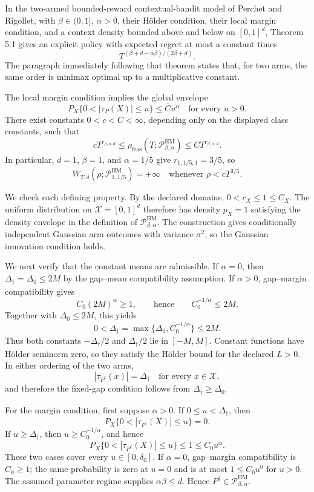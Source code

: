 In the two-armed bounded-reward contextual-bandit model of Perchet and Rigollet, with \(\beta\in(0,1]\), \(\alpha>0\), their H\"older condition, their local margin condition, and a context density bounded above and below on \([0,1]^d\), Theorem 5.1 gives an explicit policy with expected regret at most a constant times
\[
T^{(\beta+d-\alpha\beta)/(2\beta+d)}.
\]
The paragraph immediately following that theorem states that, for two arms, the same order is minimax optimal up to a multiplicative constant.

The local margin condition implies the global envelope
\[
P_X\{0<|\tau_P(X)|\leq u\}\leq\overline C u^\alpha
\quad\text{for every }u>0.
\]
There exist constants \(0<c<C<\infty\), depending only on the displayed class constants, such that
\[
cT^{r_{\beta,\alpha,d}}
\leq\rho_{\mathrm{feas}}(T;\mathcal P_{\beta,\alpha}^{\mathrm{HM}})
\leq CT^{r_{\beta,\alpha,d}}.
\]
In particular, \(d=1\), \(\beta=1\), and \(\alpha=1/5\) give \(r_{1,1/5,1}=3/5\), so
\[
W_{T,\delta}(\rho;\mathcal P_{1,1/5}^{\mathrm{HM}})=+\infty
\quad\text{whenever }\rho<cT^{3/5}.
\]

We check each defining property.  By the declared domains, \(0<c_X\leq1\leq C_X\).  The uniform distribution on \(\mathcal X=[0,1]^d\) therefore has density \(p_X=1\) satisfying the density envelope in the definition of \(\mathcal P_{\beta,\alpha}^{\mathrm{HM}}\).  The construction gives conditionally independent Gaussian arm outcomes with variance \(\sigma^2\), so the Gaussian innovation condition holds.

We next verify that the constant means are admissible.  If \(\alpha=0\), then \(\Delta_\dagger=\Delta_0\leq2M\) by the gap--mean compatibility assumption.  If \(\alpha>0\), gap--margin compatibility gives
\[
C_0(2M)^\alpha\geq1,
\qquad\text{hence}\qquad
C_0^{-1/\alpha}\leq2M.
\]
Together with \(\Delta_0\leq2M\), this yields
\[
0<\Delta_\dagger=\max\{\Delta_0,C_0^{-1/\alpha}\}\leq2M.
\]
Thus both constants \(-\Delta_\dagger/2\) and \(\Delta_\dagger/2\) lie in \([-M,M]\).  Constant functions have H\"older seminorm zero, so they satisfy the H\"older bound for the declared \(L>0\).  In either ordering of the two arms,
\[
|\tau_{P^\dagger}(x)|=\Delta_\dagger
\quad\text{for every }x\in\mathcal X,
\]
and therefore the fixed-gap condition follows from \(\Delta_\dagger\geq\Delta_0\).

For the margin condition, first suppose \(\alpha>0\).  If \(0\leq u<\Delta_\dagger\), then
\[
P_X\{0<|\tau_{P^\dagger}(X)|\leq u\}=0.
\]
If \(u\geq\Delta_\dagger\), then \(u\geq C_0^{-1/\alpha}\), and hence
\[
P_X\{0<|\tau_{P^\dagger}(X)|\leq u\}
\leq1\leq C_0u^\alpha.
\]
These two cases cover every \(u\in[0,\delta_0]\).  If \(\alpha=0\), gap--margin compatibility is \(C_0\geq1\); the same probability is zero at \(u=0\) and is at most \(1\leq C_0u^0\) for \(u>0\).  The assumed parameter regime supplies \(\alpha\beta\leq d\).  Hence \(P^\dagger\in\mathcal P_{\beta,\alpha}^{\mathrm{HM}}\).

